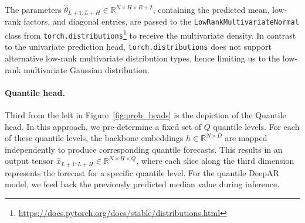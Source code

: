 \documentclass[a4paper,oneside,bibliography=totoc]{scrbook}
\begin{document}
%
The parameters $\hat{\theta}_{L+1:L+H} \in \mathbb{R}^{N \times H \times R+2}$, containing the predicted mean, low-rank factors, and diagonal entries, are passed to the \texttt{LowRankMultivariateNormal} class from \texttt{torch.distributions}\footnote{\href{https://docs.pytorch.org/docs/stable/distributions.html}{https://docs.pytorch.org/docs/stable/distributions.html}} to receive the multivariate density. 
In contrast to the univariate prediction head, \texttt{torch.distributions} does not support alternative low-rank multivariate distribution types, hence limiting us to the low-rank multivariate Gaussian distribution.

\paragraph{Quantile head.} 
Third from the left in Figure~\ref{fig:prob_heads} is the depiction of the Quantile head. In this approach, we pre-determine a fixed set of \( Q \) quantile levels. For each of these quantile levels, the backbone embeddings \( h \in \mathbb{R}^{N \times D} \) are mapped independently to produce corresponding quantile forecasts. This results in an output tensor \( \hat{x}_{L+1:L+H} \in \mathbb{R}^{N \times H \times Q} \), where each slice along the third dimension represents the forecast for a specific quantile level.
For the quantile DeepAR model, we feed back the previously predicted median value during inference.
\end{document}
